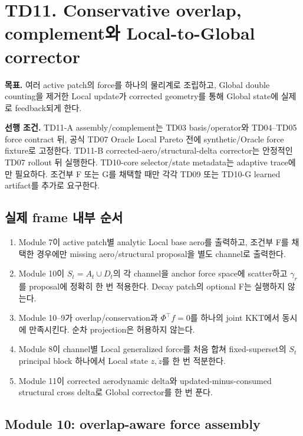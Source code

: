 \documentclass[10pt,a4paper]{article}
\begin{document}
\section{TD11. Conservative overlap, complement와 Local-to-Global corrector}

\textbf{목표.}
여러 active patch의 force를 하나의 물리계로 조립하고,
Global double counting을 제거한 Local update가 corrected geometry를 통해 Global state에 실제로 feedback되게 한다.

\textbf{선행 조건.}
TD11-A assembly/complement는 TD03 basis/operator와 TD04--TD05 force contract 뒤,
공식 TD07 Oracle Local Pareto 전에 synthetic/Oracle force fixture로 고정한다.
TD11-B corrected-aero/structural-delta corrector는 안정적인 TD07 rollout 뒤 실행한다.
TD10-core selector/state metadata는 adaptive trace에만 필요하다.
조건부 F 또는 G를 채택할 때만 각각 TD09 또는 TD10-G learned artifact를 추가로 요구한다.

\subsection*{실제 frame 내부 순서}

\begin{enumerate}
  \item Module 7이 active patch별 analytic Local base aero를 출력하고, 조건부 F를 채택한 경우에만 missing aero/structural proposal을 별도 channel로 출력한다.
  \item Module 10이 \(S_t=A_t\cup D_t\)의 각 channel을 anchor force space에 scatter하고 \(\gamma_r\)를 proposal에 정확히 한 번 적용한다. Decay patch의 optional F는 실행하지 않는다.
  \item Module 10--9가 overlap/conservation과 \(\Phi^\top f=0\)를 하나의 joint KKT에서 동시에 만족시킨다. 순차 projection은 허용하지 않는다.
  \item Module 8이 channel별 Local generalized force를 처음 합쳐 fixed-superset의 \(S_t\) principal block 하나에서 Local state \(z,\dot z\)를 한 번 적분한다.
  \item Module 11이 corrected aerodynamic delta와 updated-minus-consumed structural cross delta로 Global corrector를 한 번 푼다.
\end{enumerate}

\subsection*{Module 10: overlap-aware force assembly}
\end{document}
